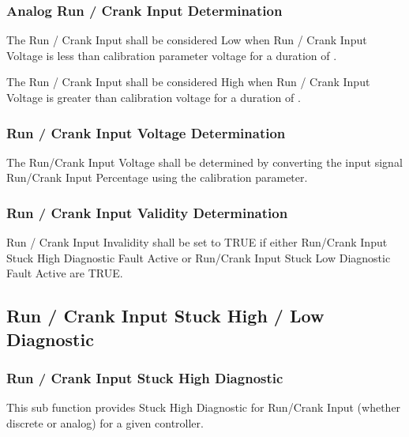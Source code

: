 \subsubsection{Analog Run / Crank Input Determination}
{The Run / Crank Input shall be considered Low when Run / Crank Input Voltage is less than calibration parameter  voltage for a duration of .

The Run / Crank Input shall be considered High when Run / Crank Input Voltage is greater than calibration  voltage for a duration of .
}
{ }

\subsubsection{Run / Crank Input Voltage Determination}
{The Run/Crank Input Voltage shall be determined by converting the input signal Run/Crank Input Percentage using the  calibration parameter.
}
{   }

\subsubsection{Run / Crank Input Validity Determination}
{Run / Crank Input Invalidity shall be set to TRUE if either Run/Crank Input Stuck High Diagnostic Fault Active or Run/Crank Input Stuck Low Diagnostic Fault Active are TRUE.
}
{  }

\subsection{Run / Crank Input Stuck High / Low Diagnostic}
\label{sec:run_crank_input_stuck}

\subsubsection{Run / Crank Input Stuck High Diagnostic}

{This sub function provides Stuck High Diagnostic for Run/Crank Input (whether discrete or analog) for a given controller.
}
{  }

